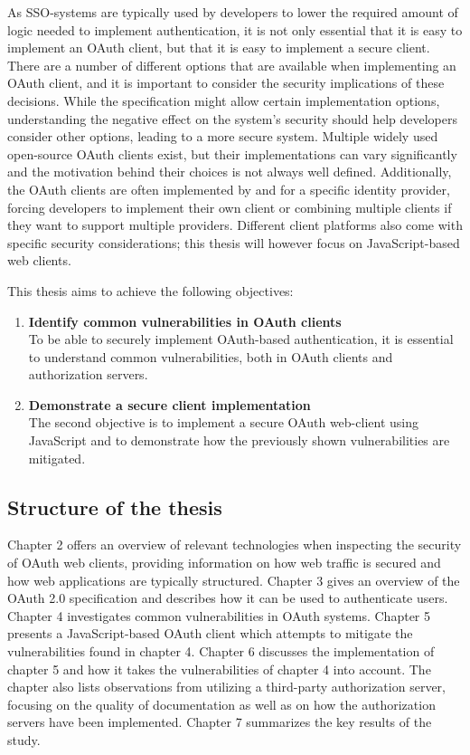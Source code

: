 As SSO-systems are typically used by developers to lower the required amount of logic needed to implement authentication, it is not only essential that it is easy to implement an OAuth client, but that it is easy to implement a secure client.
There are a number of different options that are available when implementing an OAuth client, and it is important to consider the security implications of these decisions.
While the specification might allow certain implementation options, understanding the negative effect on the system's security should help developers consider other options, leading to a more secure system.
Multiple widely used open-source OAuth clients  exist, but their implementations can vary significantly and the motivation behind their choices is not always well defined.
Additionally, the OAuth clients are often implemented by and for a specific identity provider, forcing developers to implement their own client or combining multiple clients if they want to support multiple providers.
Different client platforms also come with specific security considerations; this thesis will however focus on JavaScript-based web clients.

This thesis aims to achieve the following objectives:
\begin{enumerate}
    \item \textbf{Identify common vulnerabilities in OAuth clients} \\
    To be able to securely implement OAuth-based authentication, it is essential to understand common vulnerabilities, both in OAuth clients and authorization servers.
    \item \textbf{Demonstrate a secure client implementation} \\
    The second objective is to implement a secure OAuth web-client using JavaScript and to demonstrate how the previously shown vulnerabilities are mitigated.
\end{enumerate}

\subsection{Structure of the thesis}

Chapter 2 offers an overview of relevant technologies when inspecting the security of OAuth web clients, 
providing information on how web traffic is secured and how web applications are typically structured.
Chapter 3 gives an overview of the OAuth 2.0 specification and describes how it can be used to authenticate users.
Chapter 4 investigates common vulnerabilities in OAuth systems.
Chapter 5 presents a JavaScript-based OAuth client which attempts to mitigate the vulnerabilities found in chapter 4.
Chapter 6 discusses the implementation of chapter 5 and how it takes the vulnerabilities of chapter 4 into account. The chapter also lists observations from utilizing a third-party authorization server, focusing on the quality of documentation as well as on how the authorization servers have been implemented.
Chapter 7 summarizes the key results of the study.

